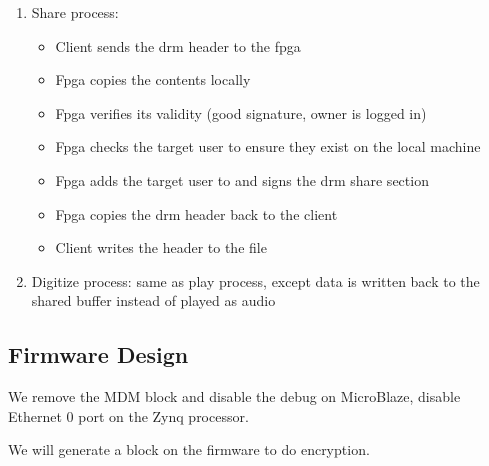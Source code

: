 \documentclass[11pt]{extarticle}
\begin{document}
\begin{enumerate}
    \item Share process:
    \begin{itemize}
        \item Client sends the drm header to the fpga
        \item Fpga copies the contents locally
        \item Fpga verifies its validity (good signature, owner is logged in)
        \item Fpga checks the target user to ensure they exist on the local machine
        \item Fpga adds the target user to and signs the drm share section
        \item Fpga copies the drm header back to the client
        \item Client writes the header to the file
    \end{itemize}
    
    \item Digitize process: same as play process, except data is written back to the shared buffer instead of played as audio
\end{enumerate}


\subsection{Firmware Design}
We remove the MDM block and disable the debug on MicroBlaze, disable Ethernet 0 port on the Zynq processor.

We will generate a block on the firmware to do encryption.
\end{document}
